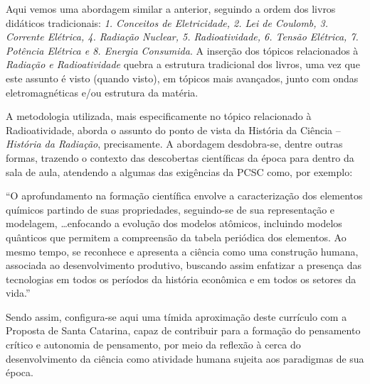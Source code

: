 Aqui vemos uma abordagem similar a anterior, seguindo a ordem dos livros didáticos tradicionais: \emph{1. Conceitos de Eletricidade, 2. Lei de Coulomb, 3. Corrente Elétrica, 4. Radiação Nuclear, 5. Radioatividade, 6. Tensão Elétrica, 7. Potência Elétrica e 8. Energia Consumida}. A inserção dos tópicos relacionados à \emph{Radiação e Radioatividade} quebra a estrutura tradicional dos livros, uma vez que este assunto é visto (quando visto), em tópicos mais avançados, junto com ondas eletromagnéticas e/ou estrutura da matéria.

A metodologia utilizada, mais especificamente no tópico relacionado à Radioatividade, aborda o assunto do ponto de vista da História da Ciência -- \emph{História da Radiação}, precisamente. A abordagem desdobra-se, dentre outras formas, trazendo o contexto das descobertas científicas da época para dentro da sala de aula, atendendo a algumas das exigências da \ac{PCSC} como, por exemplo:

\begin{citacao}
    ``O aprofundamento na formação científica envolve a caracterização dos elementos químicos partindo de suas propriedades, seguindo-se de sua representação e modelagem, \ldots enfocando a evolução dos modelos atômicos, incluindo modelos quânticos que permitem a compreensão da tabela periódica dos elementos. Ao mesmo tempo, se reconhece e apresenta a ciência como uma construção humana, associada ao desenvolvimento produtivo, buscando assim enfatizar a presença das tecnologias em todos os períodos da história econômica e em todos os setores da vida.'' 
\end{citacao}
Sendo assim, configura-se aqui uma tímida aproximação deste currículo com a Proposta de Santa Catarina, capaz de contribuir para a formação do pensamento crítico e autonomia de pensamento, por meio da reflexão à cerca do desenvolvimento da ciência como atividade humana sujeita aos paradigmas de sua época.
